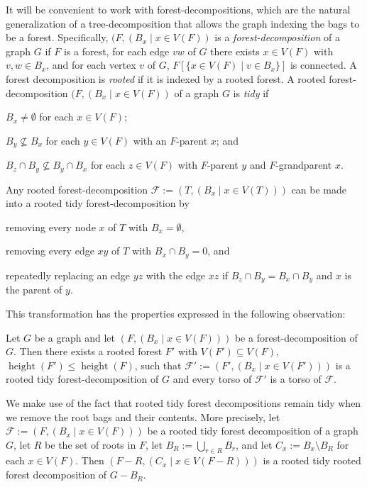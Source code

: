 \documentclass{patmorin}
\renewcommand{\le}{\leqslant}
\newcommand{\pat}[1]{\noindent\textcolor{Magenta}{PaMo: #1}}
\newcommand{\piotr}[1]{\noindent\textcolor{red}{PiMi: #1}}
\newcommand{\defin}[1]{\emph{\textcolor{brightmaroon}{#1}}}
\DeclareMathOperator{\height}{height}
\newcommand{\calF}{\mathcal{F}}
\begin{document}
  It will be convenient to work with forest-decompositions, which are the natural generalization of a tree-decomposition that allows the graph indexing the bags to be a forest.  Specifically, $(F,(B_x\mid x\in V(F))$ is a \defin{forest-decomposition} of a graph $G$ if $F$ is a forest, for each edge $vw$ of $G$ there exists $x\in V(F)$ with $v,w\in B_x$, and for each vertex $v$ of $G$, $F[\{x\in V(F)\mid v\in B_x\}]$ is connected.  A forest decomposition is \defin{rooted} if it is indexed by a rooted forest.  A rooted forest-decomposition $(F,(B_x\mid x\in V(F))$ of a graph $G$ is \defin{tidy} if
  \begin{enumerate*}[label=(\arabic*)]
  \item $B_x\neq\emptyset$ for each $x\in V(F)$;
  \item $B_y\not\subseteq B_x$ for each $y\in V(F)$ with an $F$-parent $x$; and
  \item $B_z \cap B_y \not\subseteq B_y\cap B_x$ for each $z\in V(F)$ with $F$-parent $y$ and $F$-grandparent $x$.
  \end{enumerate*}
  Any rooted forest-decomposition $\calF:=(T,(B_x\mid x\in V(T)))$ can be made into a rooted tidy forest-decomposition by
  \begin{enumerate*}[label=(\arabic*)]
  \item removing every node $x$ of $T$ with $B_x=\emptyset$,
  \item removing every edge $xy$ of $T$ with $B_x\cap B_y=0$, and
  \item repeatedly replacing an edge $yz$ with the edge $xz$ if $B_z\cap B_y=B_x\cap B_y$ and $x$ is the parent of $y$.
  \end{enumerate*}
  This transformation has the properties expressed in the following observation:
  \begin{obs}\label{tidy_forest}
    Let $G$ be a graph and let $(F,(B_x\mid x\in V(F)))$ be a forest-decomposition of $G$. Then there exists a rooted forest $F'$ with $V(F')\subseteq V(F)$, $\height(F')\le\height(F)$, such that $\calF':=(F',(B_x\mid x\in V(F')))$ is a rooted tidy forest-decomposition of $G$ and every torso of $\calF'$ is a torso of $\calF$.
  \end{obs}
  We make use of the fact that rooted tidy forest decompositions remain tidy when we remove the root bags and their contents.  More precisely, let $\calF:=(F,(B_x\mid x\in V(F)))$ be a rooted tidy forest decomposition of a graph $G$, let $R$ be the set of roots in $F$, let $B_R:=\bigcup_{r\in R}B_r$, and let $C_x:=B_x\setminus B_R$ for each $x\in V(F)$.  Then $(F-R,(C_x\mid x\in V(F-R)))$ is a rooted tidy rooted forest decomposition of $G-B_R$.
\end{document}
